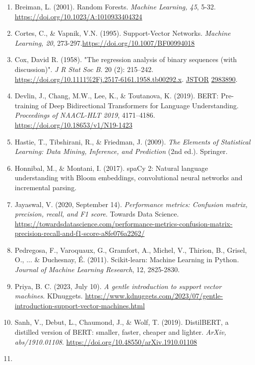 \documentclass[
]{article}
\begin{document}
\begin{enumerate}
\def\labelenumi{\arabic{enumi}.}
\item
  Breiman, L. (2001). Random Forests. \emph{Machine Learning, 45}, 5-32.
  \url{https://doi.org/10.1023/A:1010933404324}
\item
  Cortes, C., \& Vapnik, V.N. (1995). Support-Vector Networks.
  \emph{Machine Learning, 20},
  273-297.\url{https://doi.org/10.1007/BF00994018}
\item
  Cox, David R. (1958). "The regression analysis of binary sequences
  (with discussion)". \emph{J R Stat Soc B}. 20 (2): 215--242.
  \url{https://doi.org/10.1111\%2Fj.2517-6161.1958.tb00292.x}.
  \href{https://en.wikipedia.org/wiki/JSTOR_(identifier)}{JSTOR}
  \href{https://www.jstor.org/stable/2983890}{2983890}.
\item
  Devlin, J., Chang, M.W., Lee, K., \& Toutanova, K. (2019). BERT:
  Pre-training of Deep Bidirectional Transformers for Language
  Understanding. \emph{Proceedings of NAACL-HLT 2019}, 4171--4186.
  \url{https://doi.org/10.18653/v1/N19-1423}
\item
  Hastie, T., Tibshirani, R., \& Friedman, J. (2009). \emph{The Elements
  of Statistical Learning: Data Mining, Inference, and Prediction} (2nd
  ed.). Springer.
\item
  Honnibal, M., \& Montani, I. (2017). spaCy 2: Natural language
  understanding with Bloom embeddings, convolutional neural networks and
  incremental parsing.
\item
  Jayaswal, V. (2020, September 14). \emph{Performance metrics:
  Confusion matrix, precision, recall, and F1 score}. Towards Data
  Science.
  \url{https://towardsdatascience.com/performance-metrics-confusion-matrix-precision-recall-and-f1-score-a8fe076a2262/}
\item
  Pedregosa, F., Varoquaux, G., Gramfort, A., Michel, V., Thirion, B.,
  Grisel, O., ... \& Duchesnay, É. (2011). Scikit-learn: Machine
  Learning in Python. \emph{Journal of Machine Learning Research}, 12,
  2825-2830.
\item
  Priya, B. C. (2023, July 10). \emph{A gentle introduction to support
  vector machines}. KDnuggets.
  \url{https://www.kdnuggets.com/2023/07/gentle-introduction-support-vector-machines.html}
\item
  Sanh, V., Debut, L., Chaumond, J., \& Wolf, T. (2019). DistilBERT, a
  distilled version of BERT: smaller, faster, cheaper and lighter.
  \emph{ArXiv, abs/1910.01108}.
  \url{https://doi.org/10.48550/arXiv.1910.01108}
\item

\end{enumerate}
\end{document}
